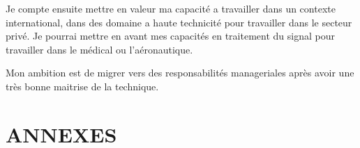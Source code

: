 Je compte ensuite mettre en valeur ma capacité a travailler dans un contexte international, dans des domaine a haute technicité pour travailler dans le secteur privé. Je pourrai mettre en avant mes capacités en traitement du signal pour travailler dans le médical ou l'aéronautique.

Mon ambition est de migrer vers des responsabilités manageriales après avoir une très bonne maitrise de la technique.








\section{ANNEXES}



